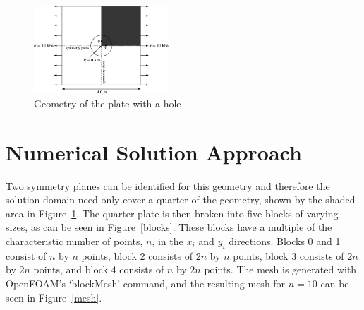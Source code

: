 \documentclass[twocolumn,10pt]{asme2ej}
\begin{document}
\begin{figure}[t]
\begin{center}
\includegraphics[width=0.45\textwidth]{figure/user144x.png}
\caption{Geometry of the plate with a hole \cite{ctfm_1}}
\label{geometry}
\end{center}
\end{figure}

\section{Numerical Solution Approach}
 Two symmetry planes can be identified for this geometry and therefore the solution domain need only cover a quarter of the geometry, shown by the shaded area in Figure~\ref{geometry}. The quarter plate is then broken into five blocks of varying sizes, as can be seen in Figure~\ref{blocks}. These blocks have a multiple of the characteristic number of points, $n$, in the $x_i$ and $y_i$ directions. Blocks 0 and 1 consist of $n$ by $n$ points, block 2 consists of $2n$ by $n$ points, block 3 consists of $2n$ by $2n$ points, and block 4 consists of $n$ by $2n$ points. The mesh is generated with OpenFOAM's `blockMesh' command, and the resulting mesh for $n = 10$ can be seen in Figure~\ref{mesh}.
\end{document}
